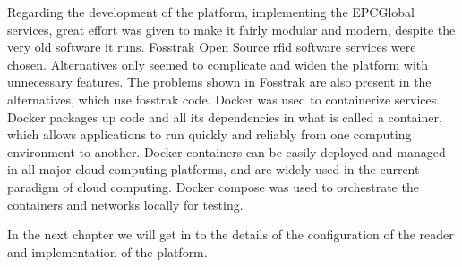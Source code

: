 Regarding the development of the platform, implementing the EPCGlobal services, great effort was given to make it fairly modular and modern, despite the very old software it runs.
Fosstrak Open Source \ac{rfid} software services were chosen. Alternatives only seemed to complicate and widen the platform with unnecessary features. The problems shown in Fosstrak are also present in the alternatives, which use fosstrak code.
Docker was used to containerize services. 
Docker packages up code and all its dependencies in what is called a container, which allows applications to run quickly and reliably from one computing environment to another. Docker containers can be easily deployed and managed in all major cloud computing platforms, and are widely used in the current paradigm of cloud computing.
Docker compose was used to orchestrate the containers and networks locally for testing.

In the next chapter we will get in to the details of the configuration of the reader and implementation of the platform.

